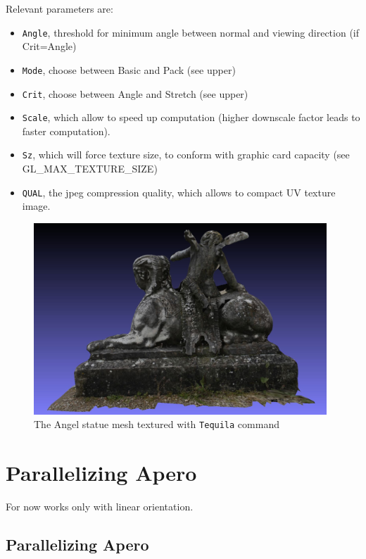 Relevant parameters are:
\begin{itemize}
\item {\tt Angle}, threshold for minimum angle between normal and viewing direction (if Crit=Angle)
\item {\tt Mode}, choose between Basic and Pack (see upper)
\item {\tt Crit}, choose between Angle and Stretch (see upper)
\item {\tt Scale}, which allow to speed up computation (higher downscale factor leads to faster computation).
\item {\tt Sz}, which will force texture size, to conform with graphic card capacity (see GL\_MAX\_TEXTURE\_SIZE)
\item {\tt QUAL}, the jpeg compression quality, which allows to compact UV texture image.
\end{itemize}

\begin{figure}[H]
\begin{center}
\includegraphics[width=110mm]{FIGS/Ange/Tequila.jpg}
\end{center}
\caption{The Angel statue mesh textured with {\tt Tequila} command}
\label{FIG:Angel:Tequila}
\end{figure}

\section{Parallelizing Apero}

For now works only with linear orientation.

\subsection{Parallelizing Apero}

